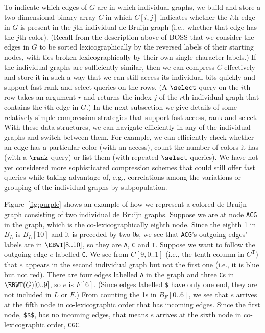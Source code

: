 \documentclass[doctor]{thesis}
\begin{document}
To indicate which edges of $G$ are in which individual graphs, we build and store a two-dimensional binary array $C$ in which \(C [i, j]\) indicates whether the $i$th edge in $G$ is present in the $j$th individual de Bruijn graph (i.e., whether that edge has the $j$th color). 
(Recall from the description above of BOSS that we consider the edges in $G$ to be sorted lexicographically by the reversed labels of their starting nodes, with ties broken lexicographically by their own single-character labels.) 
If the individual graphs are sufficiently similar, then we can compress $C$ effectively and store it in such a way that we can still access its individual bits quickly and support fast rank and select queries on the rows.  (A $\select$ query on the $i$th row takes an argument $r$ and returns the index $j$ of the $r$th individual graph that contains the $i$th edge in $G$.)  In the next subsection we give details of some relatively simple compression strategies that support fast access, rank and select.  With these data structures, we can navigate efficiently in any of the individual graphs and switch between them.  For example, we can efficiently check whether an edge has a particular color (with an access), count the number of colors it has (with a $\rank$ query) or list them (with repeated $\select$ queries).  We have not yet considered more sophisticated compression schemes that could still offer fast queries while taking advantage of, e.g., correlations among the variations or grouping of the individual graphs by subpopulation.

Figure~\ref{fig:purple} shows an example of how we represent a colored de Bruijn graph consisting of two individual de Bruijn graphs.  Suppose we are at node {\tt ACG} in the graph, which is the co-lexicographically eighth node.  Since the eighth 1 in $B_L$ is \(B_L [10]\) and it is preceded by two 0s, we see that {\tt ACG}'s outgoing edges' labels are in \(\EBWT [8..10]\), so they are {\tt A}, {\tt C} and {\tt T}.  Suppose we want to follow the outgoing edge $e$ labelled {\tt C}.  We see from \(C [9, 0..1]\) (i.e., the tenth column in $C^\mathrm{T}$) that $e$ appears in the second individual graph but not the first one (i.e., it is blue but not red).    There are four edges labelled {\tt A} in the graph and three {\tt C}s in \(\EBWT (G) [0..9]\), so $e$ is \(F [6]\).  (Since edges labelled {\tt \$} have only one end, they are not included in $L$ or $F$.)  From counting the 1s in \(B_F [0..6]\), we see that $e$ arrives at the fifth node in co-lexicographic order that has incoming edges.  Since the first node, {\tt \$\$\$}, has no incoming edges, that means $e$ arrives at the sixth node in co-lexicographic order, {\tt CGC}.
\end{document}
